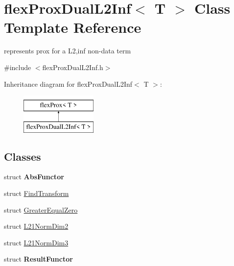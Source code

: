 \hypertarget{classflex_prox_dual_l2_inf}{}\section{flex\+Prox\+Dual\+L2\+Inf$<$ T $>$ Class Template Reference}
\label{classflex_prox_dual_l2_inf}


represents prox for a L2,inf non-\/data term  




{\ttfamily \#include $<$flex\+Prox\+Dual\+L2\+Inf.\+h$>$}

Inheritance diagram for flex\+Prox\+Dual\+L2\+Inf$<$ T $>$\+:\begin{figure}[H]
\begin{center}
\leavevmode
\includegraphics[height=2.000000cm]{classflex_prox_dual_l2_inf}
\end{center}
\end{figure}
\subsection*{Classes}
\begin{DoxyCompactItemize}
\item 
struct {\bfseries Abs\+Functor}
\item 
struct \hyperlink{structflex_prox_dual_l2_inf_1_1_find_transform}{Find\+Transform}
\item 
struct \hyperlink{structflex_prox_dual_l2_inf_1_1_greater_equal_zero}{Greater\+Equal\+Zero}
\item 
struct \hyperlink{structflex_prox_dual_l2_inf_1_1_l21_norm_dim2}{L21\+Norm\+Dim2}
\item 
struct \hyperlink{structflex_prox_dual_l2_inf_1_1_l21_norm_dim3}{L21\+Norm\+Dim3}
\item 
struct {\bfseries Result\+Functor}
\end{DoxyCompactItemize}
